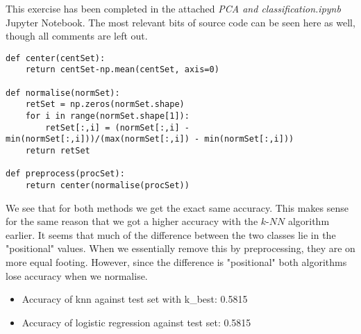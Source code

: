 This exercise has been completed in the attached \textit{PCA and classification.ipynb} Jupyter Notebook. The most relevant bits of source code can be seen here as well, though all comments are left out.
\begin{verbatim}
def center(centSet):
    return centSet-np.mean(centSet, axis=0)

def normalise(normSet):
    retSet = np.zeros(normSet.shape)
    for i in range(normSet.shape[1]):
        retSet[:,i] = (normSet[:,i] - min(normSet[:,i]))/(max(normSet[:,i]) - min(normSet[:,i]))
    return retSet

def preprocess(procSet):
    return center(normalise(procSet))
\end{verbatim}
We see that for both methods we get the exact same accuracy. This makes sense for the same reason that we got a higher accuracy with the $k$-$NN$ algorithm earlier. It seems that much of the difference between the two classes lie in the "positional" values. When we essentially remove this by preprocessing, they are on more equal footing. However, since the difference is "positional" both algorithms lose accuracy when we normalise.
\begin{itemize}
\item Accuracy of knn against test set with k\_best: 0.5815
\item Accuracy of logistic regression against test set: 0.5815
\end{itemize}